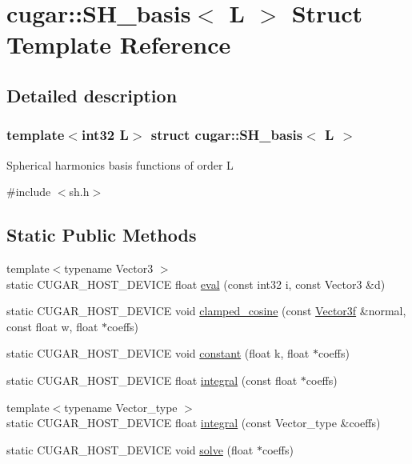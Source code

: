 \hypertarget{structcugar_1_1_s_h__basis}{}\section{cugar\+:\+:S\+H\+\_\+basis$<$ L $>$ Struct Template Reference}
\label{structcugar_1_1_s_h__basis}


\subsection{Detailed description}
\subsubsection*{template$<$int32 L$>$\newline
struct cugar\+::\+S\+H\+\_\+basis$<$ L $>$}

Spherical harmonics basis functions of order L 

{\ttfamily \#include $<$sh.\+h$>$}

\subsection*{Static Public Methods}
\begin{DoxyCompactItemize}
\item 
{\footnotesize template$<$typename Vector3 $>$ }\\static C\+U\+G\+A\+R\+\_\+\+H\+O\+S\+T\+\_\+\+D\+E\+V\+I\+CE float \hyperlink{structcugar_1_1_s_h__basis_acc9543bf841c9c8970300f60fc47e5ef}{eval} (const int32 i, const Vector3 \&d)
\item 
static C\+U\+G\+A\+R\+\_\+\+H\+O\+S\+T\+\_\+\+D\+E\+V\+I\+CE void \hyperlink{structcugar_1_1_s_h__basis_a0582cd1dc8fdfd9e6752fde399cfaaf0}{clamped\+\_\+cosine} (const \hyperlink{structcugar_1_1_vector}{Vector3f} \&normal, const float w, float $\ast$coeffs)
\item 
static C\+U\+G\+A\+R\+\_\+\+H\+O\+S\+T\+\_\+\+D\+E\+V\+I\+CE void \hyperlink{structcugar_1_1_s_h__basis_ad090d345301f626d3f10b51ccade7e68}{constant} (float k, float $\ast$coeffs)
\item 
static C\+U\+G\+A\+R\+\_\+\+H\+O\+S\+T\+\_\+\+D\+E\+V\+I\+CE float \hyperlink{structcugar_1_1_s_h__basis_adfba32c9f637a576bdb8761e5393c7f7}{integral} (const float $\ast$coeffs)
\item 
{\footnotesize template$<$typename Vector\+\_\+type $>$ }\\static C\+U\+G\+A\+R\+\_\+\+H\+O\+S\+T\+\_\+\+D\+E\+V\+I\+CE float \hyperlink{structcugar_1_1_s_h__basis_a8a6a16022c216964f777d7d6668a739c}{integral} (const Vector\+\_\+type \&coeffs)
\item 
static C\+U\+G\+A\+R\+\_\+\+H\+O\+S\+T\+\_\+\+D\+E\+V\+I\+CE void \hyperlink{structcugar_1_1_s_h__basis_abf09a4757b23d89f9691753746fd1649}{solve} (float $\ast$coeffs)
\end{DoxyCompactItemize}

